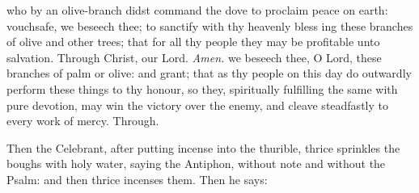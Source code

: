{} who by an olive-branch didst command the dove to proclaim peace on earth: vouchsafe, we beseech thee; to sanctify with thy heavenly bless {} ing these branches of olive and other trees; that for all thy people they may be profitable unto salvation. Through Christ, our Lord. \textit{Amen.}
{} we beseech thee, O Lord, these branches of palm or olive: and grant; that as thy people on this day do outwardly perform these things to thy honour, so they, spiritually fulfilling the same with pure devotion, may win the victory over the enemy, and cleave steadfastly to every work of mercy. Through.
\begin{rubric}
    Then the Celebrant, after putting incense into the thurible, thrice sprinkles the boughs with holy water, saying the Antiphon,  without note and without the Psalm: and then thrice incenses them. Then he says:
\end{rubric}

